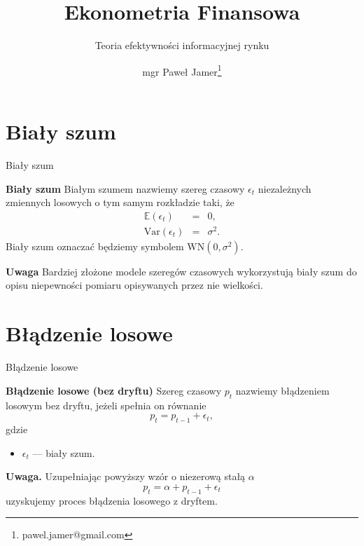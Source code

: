 \documentclass[a4paper, 11pt]{beamer}
\title{Ekonometria Finansowa}
\subtitle{Teoria efektywności informacyjnej rynku}
\author{mgr Paweł Jamer\thanks{pawel.jamer@gmail.com}}
\begin{document}
	\begin{frame}
		\titlepage
	\end{frame}
	
	\section{Biały szum}
	
	\begin{frame}{Biały szum}
		\begin{block}{\textbf{Biały szum}}
			Białym szumem nazwiemy szereg czasowy $\epsilon_t$ niezależnych zmiennych losowych o tym samym rozkładzie taki, że \begin{eqnarray*}
				\mathbb{E}\left(\epsilon_t\right) & = & 0,\\
				\mbox{Var}\left(\epsilon_t\right) & = & \sigma^2.
			\end{eqnarray*} Biały szum oznaczać będziemy symbolem $\mbox{WN}\left(0, \sigma^2\right)$.
		\end{block}
		\begin{alert}{\textbf{Uwaga}}
			Bardziej złożone modele szeregów czasowych wykorzystują biały szum do opisu niepewności pomiaru opisywanych przez nie wielkości.
		\end{alert}
	\end{frame}
	
	\section{Błądzenie losowe}
	
	\begin{frame}{Błądzenie losowe}
		\begin{block}{\textbf{Błądzenie losowe (bez dryftu)}}
			Szereg czasowy $p_t$ nazwiemy błądzeniem losowym bez dryftu, jeżeli spełnia on równanie \[
				p_t = p_{t-1} + \epsilon_t,
			\] gdzie
			\begin{itemize}
				\item $\epsilon_t$ --- biały szum.
			\end{itemize}
		\end{block}
		\begin{alert}{\textbf{Uwaga.}}
			Uzupełniając powyższy wzór o niezerową stałą $\alpha$ \[
				p_t = \alpha + p_{t-1} + \epsilon_t
			\] uzyskujemy proces błądzenia losowego z dryftem.
		\end{alert}
	\end{frame}
	
\end{document}
